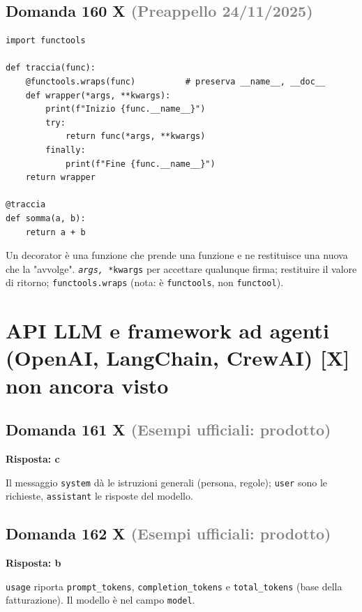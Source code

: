 \documentclass[a4paper,11pt]{article}
\begin{document}
\subsection*{Domanda 160 X \hfill {\small \textcolor{gray}{(Preappello 24/11/2025)}}}


\begin{verbatim}
import functools

def traccia(func):
    @functools.wraps(func)          # preserva __name__, __doc__
    def wrapper(*args, **kwargs):
        print(f"Inizio {func.__name__}")
        try:
            return func(*args, **kwargs)
        finally:
            print(f"Fine {func.__name__}")
    return wrapper

@traccia
def somma(a, b):
    return a + b
\end{verbatim}
Un decorator è una funzione che prende una funzione e ne restituisce una nuova che la "avvolge". \texttt{\textit{args, }*kwargs} per accettare qualunque firma; restituire il valore di ritorno; \texttt{functools.wraps} (nota: è \texttt{functools}, non \texttt{functool}).



\section{API LLM e framework ad agenti (OpenAI, LangChain, CrewAI) [X] non ancora visto}

\subsection*{Domanda 161 X \hfill {\small \textcolor{gray}{(Esempi ufficiali: prodotto)}}}
\textbf{Risposta: c}\par
Il messaggio \texttt{system} dà le istruzioni generali (persona, regole); \texttt{user} sono le richieste, \texttt{assistant} le risposte del modello.



\subsection*{Domanda 162 X \hfill {\small \textcolor{gray}{(Esempi ufficiali: prodotto)}}}
\textbf{Risposta: b}\par
\texttt{usage} riporta \texttt{prompt\_tokens}, \texttt{completion\_tokens} e \texttt{total\_tokens} (base della fatturazione). Il modello è nel campo \texttt{model}.
\end{document}
